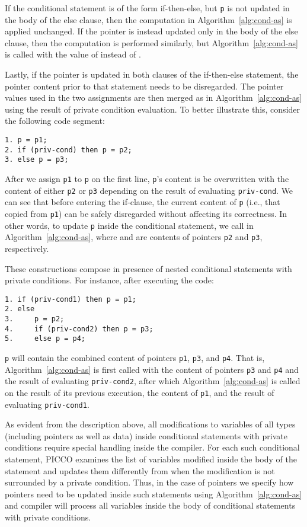 \documentclass[11pt]{article}
\begin{document}
If the conditional statement is of the form if-then-else, but \texttt{p} is
not updated in the body of the else clause, then the computation in
Algorithm~\ref{alg:cond-as} is applied unchanged. If the pointer is instead
updated only in the body of the else clause, then the computation is
performed similarly, but Algorithm~\ref{alg:cond-as} is called with the
value of  instead of . 

Lastly, if the pointer is updated in both clauses of the if-then-else
statement, the pointer content prior to that statement needs to be
disregarded. The pointer values used in the two assignments are then merged
as in Algorithm~\ref{alg:cond-as} using the result  of private condition
evaluation. To better illustrate this, consider the following code segment:

{\small \begin{verbatim}
1. p = p1;
2. if (priv-cond) then p = p2;
3. else p = p3;
\end{verbatim}}
\noindent After we assign \texttt{p1} to \texttt{p} on the first line,
\texttt{p}'s content is be overwritten with the content of either
\texttt{p2} or \texttt{p3} depending on the result  of evaluating
\texttt{priv-cond}. We can see that before entering the if-clause, the
current content of \texttt{p} (i.e., that copied from \texttt{p1}) can be
safely disregarded without affecting its correctness. In other words, to
update \texttt{p} inside the conditional statement, we call  in Algorithm~\ref{alg:cond-as}, where  and  are contents of
pointers \texttt{p2} and \texttt{p3}, respectively.

These constructions compose in presence of nested conditional statements with
private conditions. For instance, after executing the code:

{\small \begin{verbatim}
1. if (priv-cond1) then p = p1;
2. else
3.     p = p2;
4.     if (priv-cond2) then p = p3;
5.     else p = p4; 
\end{verbatim}}
\noindent \texttt{p} will contain the combined content of pointers
\texttt{p1}, \texttt{p3}, and \texttt{p4}. That is,
Algorithm~\ref{alg:cond-as} is first called with the content of pointers
\texttt{p3} and \texttt{p4} and the result  of evaluating
\texttt{priv-cond2}, after which Algorithm~\ref{alg:cond-as} is called on
the result of its previous execution, the content of \texttt{p1}, and the
result  of evaluating \texttt{priv-cond1}.

As evident from the description above, all modifications to variables of
all types (including pointers as well as data) inside conditional statements
with private conditions require special handling inside the compiler. For
each such conditional statement, PICCO examines the list of variables
modified inside the body of the statement and updates them differently from
when the modification is not surrounded by a private condition. Thus, in the
case of pointers we specify how pointers need to be updated inside such
statements using Algorithm~\ref{alg:cond-as} and compiler will process all
variables inside the body of conditional statements with private conditions.
\end{document}
